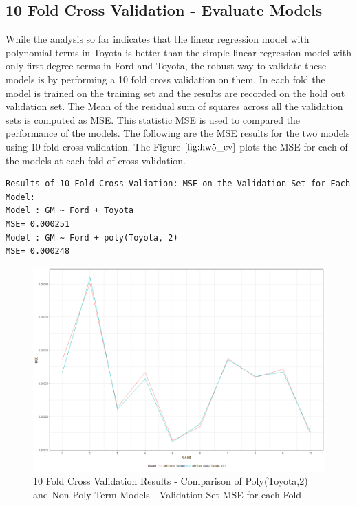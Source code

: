 \documentclass[twoside,12pt]{article}
\begin{document}
\subsection{10 Fold Cross Validation - Evaluate Models}
\label{10_fold_cv}
{
While the analysis so far indicates that the linear regression model with polynomial terms in Toyota is  better than the simple linear regression model with only first degree terms in Ford and Toyota, the robust way to validate these models is by performing a 10 fold cross validation on them.  In each fold the model is trained on the training set and the results are recorded on the hold out validation set. The Mean of the residual sum of squares across all the validation sets is computed as MSE. This statistic MSE is used to compared the performance of the models. The following are the MSE results for the two models using 10 fold cross validation. The Figure $\eqref{fig:hw5_cv}$ plots the MSE for each of the models at each fold of cross validation.

\begin{verbatim}
Results of 10 Fold Cross Valiation: MSE on the Validation Set for Each Model:
Model : GM ~ Ford + Toyota
MSE= 0.000251
Model : GM ~ Ford + poly(Toyota, 2)
MSE= 0.000248
\end{verbatim}
\begin{figure}[htbp!]
     \begin{center}
     \hspace*{-1.05in}
            \includegraphics[width=1.38\textwidth]{charts/hw5_cv_plot}
    \end{center}
    \caption{%
     10 Fold Cross Validation Results - Comparison of Poly(Toyota,2) and Non Poly Term Models - Validation Set MSE for each Fold
     }%
   \label{fig:hw5_cv}
\end{figure}
}
\end{document}

